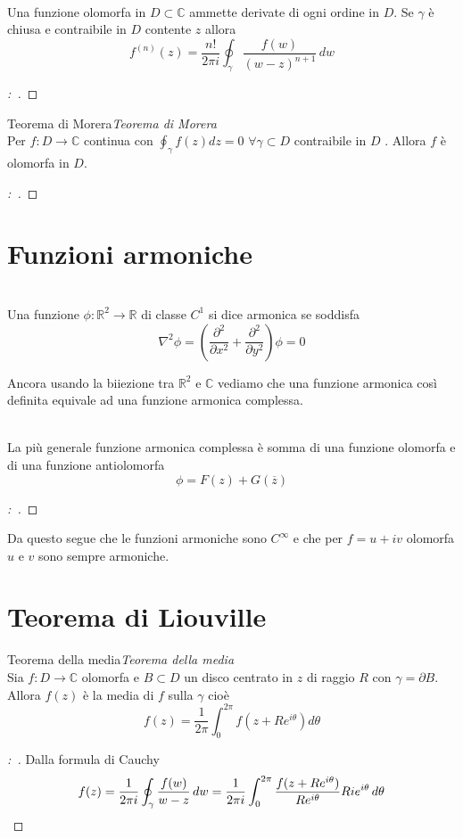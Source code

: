 \documentclass[11pt,a4paper,twoside]{book}
\newenvironment{teorema}[1][\empty]{\begin{Teorema}{
\ifx\empty#1\relax\else\mdseries\itshape#1\\\fi
}{}}{\end{Teorema}}
\newenvironment{proposizione}[1][\empty]{\begin{Proposizione}{
\ifx\empty#1\relax\else\mdseries\itshape#1\\\fi
}{}}{\end{Proposizione}}
\newenvironment{definizione}[1][\empty]{\begin{Definizione}{
\ifx\empty#1\relax\else\mdseries\itshape#1\\\fi
}{}}{\end{Definizione}}
\newenvironment{corollario}[1][\empty]{\begin{Corollario}{
\ifx\empty#1\relax\else\mdseries\itshape#1\\\fi
}{}}{\end{Corollario}}
\newenvironment{dimo}[1][\proofname]{
	\begin{tcolorbox}[
	breakable, 
	enhanced, 
	interior hidden, 
	frame hidden, 
	borderline west = {1pt}{0pt}{gray}, 
	top=0pt, bottom=0pt, left=0pt]
\begin{proof}[#1:~]
}
{
\end{proof}
\end{tcolorbox}
}
\theoremstyle{esss}
\theoremstyle{dotless}
\numberwithin{equation}{section} %
\begin{document}
\begin{corollario}
Una funzione olomorfa in $D\subset\mathbb{C}$ ammette derivate di ogni ordine in $D$. Se $\gamma$ è chiusa e contraibile in $D$ contente $z$ allora
\[
f^{(n)}(z)=\dfrac{n!}{2\pi i} \oint_\gamma \dfrac{f(w)}{(w-z)^{n+1}} \, dw
\]
\end{corollario}
\begin{dimo}

\end{dimo}

\begin{teorema}[Teorema di Morera]
Per $f:D\rightarrow\mathbb{C}$ continua con $\oint_\gamma f(z) dz =0 $ $ \forall \gamma\subset D$ contraibile in $D$ . Allora $f$ è olomorfa in $D$.
\end{teorema}
\begin{dimo}
\end{dimo}

\section{Funzioni armoniche}
\begin{definizione}
Una funzione $\phi:\mathbb{R}^2\rightarrow\mathbb{R}$ di classe $C^1$ si dice armonica se soddisfa
\[
\nabla^2\phi=\left( \dfrac{\partial^2}{\partial x^2} + \dfrac{\partial^2}{\partial y^2} \right) \phi =0
\]
\end{definizione}
Ancora usando la biiezione tra $\mathbb{R}^2$ e $\mathbb{C}$ vediamo che una funzione armonica così definita equivale ad una funzione armonica complessa.
\begin{proposizione}
La più generale funzione armonica complessa è somma di una funzione olomorfa e di una funzione antiolomorfa
\[
\phi=F(z)+G(\overline{z})
\]
\end{proposizione}
\begin{dimo}
\end{dimo}

Da questo segue che le funzioni armoniche sono $C^\infty$ e che per $f=u+iv$ olomorfa $u$ e $v$ sono sempre armoniche.

\section{Teorema di Liouville}
\begin{teorema}[Teorema della media]
Sia $f:D\rightarrow\mathbb{C}$ olomorfa e $B\subset D$ un disco centrato in $z$ di raggio $R$ con $\gamma=\partial B$. Allora $f(z)$ è la media di $f$ sulla $\gamma$ cioè
\[
f(z) = \dfrac{1}{2\pi}\int_0^{2\pi} f(z+Re^{i\theta}) d\theta 
\]
\end{teorema}
\begin{dimo}
Dalla formula di Cauchy \[ f(z)=\dfrac{1}{2\pi i} \oint_{\gamma} \dfrac{f(w)}{w-z}\,dw=\dfrac{1}{2\pi i} \int_0^{2\pi} \dfrac{f(z+Re^{i\theta})}{Re^{i\theta}}Rie^{i\theta} \,d\theta \qedhere \]
\end{dimo}
\end{document}
